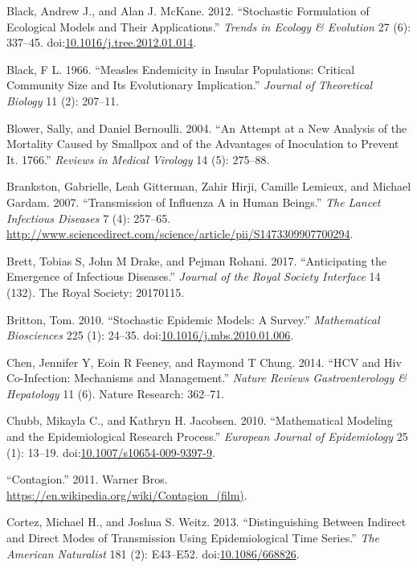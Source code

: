\documentclass[]{book}
\theoremstyle{definition}
\theoremstyle{definition}
\theoremstyle{definition}
\theoremstyle{remark}
\begin{document}
\hypertarget{ref-black12}{}
Black, Andrew J., and Alan J. McKane. 2012. ``Stochastic Formulation of
Ecological Models and Their Applications.'' \emph{Trends in Ecology \&
Evolution} 27 (6): 337--45.
doi:\href{https://doi.org/10.1016/j.tree.2012.01.014}{10.1016/j.tree.2012.01.014}.

\hypertarget{ref-black66}{}
Black, F L. 1966. ``Measles Endemicity in Insular Populations: Critical
Community Size and Its Evolutionary Implication.'' \emph{Journal of
Theoretical Biology} 11 (2): 207--11.

\hypertarget{ref-blower04}{}
Blower, Sally, and Daniel Bernoulli. 2004. ``An Attempt at a New
Analysis of the Mortality Caused by Smallpox and of the Advantages of
Inoculation to Prevent It. 1766.'' \emph{Reviews in Medical Virology} 14
(5): 275--88.

\hypertarget{ref-brankston07}{}
Brankston, Gabrielle, Leah Gitterman, Zahir Hirji, Camille Lemieux, and
Michael Gardam. 2007. ``Transmission of Influenza A in Human Beings.''
\emph{The Lancet Infectious Diseases} 7 (4): 257--65.
\url{http://www.sciencedirect.com/science/article/pii/S1473309907700294}.

\hypertarget{ref-brett17}{}
Brett, Tobias S, John M Drake, and Pejman Rohani. 2017. ``Anticipating
the Emergence of Infectious Diseases.'' \emph{Journal of the Royal
Society Interface} 14 (132). The Royal Society: 20170115.

\hypertarget{ref-britton10a}{}
Britton, Tom. 2010. ``Stochastic Epidemic Models: A Survey.''
\emph{Mathematical Biosciences} 225 (1): 24--35.
doi:\href{https://doi.org/10.1016/j.mbs.2010.01.006}{10.1016/j.mbs.2010.01.006}.

\hypertarget{ref-chen14}{}
Chen, Jennifer Y, Eoin R Feeney, and Raymond T Chung. 2014. ``HCV and
Hiv Co-Infection: Mechanisms and Management.'' \emph{Nature Reviews
Gastroenterology \& Hepatology} 11 (6). Nature Research: 362--71.

\hypertarget{ref-chubb10}{}
Chubb, Mikayla C., and Kathryn H. Jacobsen. 2010. ``Mathematical
Modeling and the Epidemiological Research Process.'' \emph{European
Journal of Epidemiology} 25 (1): 13--19.
doi:\href{https://doi.org/10.1007/s10654-009-9397-9}{10.1007/s10654-009-9397-9}.

\hypertarget{ref-contagionmovie}{}
``Contagion.'' 2011. Warner Bros.
\url{https://en.wikipedia.org/wiki/Contagion_(film)}.

\hypertarget{ref-cortez13}{}
Cortez, Michael H., and Joshua S. Weitz. 2013. ``Distinguishing Between
Indirect and Direct Modes of Transmission Using Epidemiological Time
Series.'' \emph{The American Naturalist} 181 (2): E43--E52.
doi:\href{https://doi.org/10.1086/668826}{10.1086/668826}.
\end{document}
